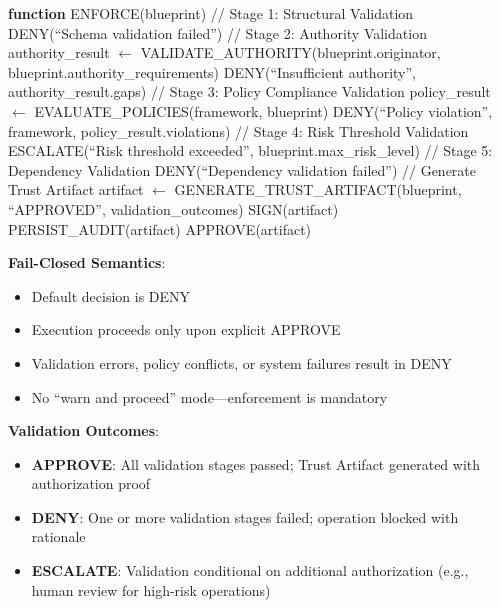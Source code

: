 \documentclass[11pt,letterpaper]{article}
\begin{document}
\begin{algorithm}
\caption{Enforcement Protocol}
\label{alg:enforce}
\begin{algorithmic}[1]
\STATE \textbf{function} ENFORCE(blueprint)
\STATE \quad // Stage 1: Structural Validation
  \RETURN DENY(``Schema validation failed'')
\ENDIF
\STATE
\STATE \quad // Stage 2: Authority Validation
\STATE \quad authority\_result $\gets$ VALIDATE\_AUTHORITY(blueprint.originator,
\STATE \qquad\qquad\qquad\qquad\qquad blueprint.authority\_requirements)
  \RETURN DENY(``Insufficient authority'', authority\_result.gaps)
\ENDIF
\STATE
\STATE \quad // Stage 3: Policy Compliance Validation
  \STATE \quad policy\_result $\gets$ EVALUATE\_POLICIES(framework, blueprint)
    \RETURN DENY(``Policy violation'', framework, policy\_result.violations)
  \ENDIF
\ENDFOR
\STATE
\STATE \quad // Stage 4: Risk Threshold Validation
  \RETURN ESCALATE(``Risk threshold exceeded'', blueprint.max\_risk\_level)
\ENDIF
\STATE
\STATE \quad // Stage 5: Dependency Validation
  \RETURN DENY(``Dependency validation failed'')
\ENDIF
\STATE
\STATE \quad // Generate Trust Artifact
\STATE \quad artifact $\gets$ GENERATE\_TRUST\_ARTIFACT(blueprint, ``APPROVED'',
\STATE \qquad\qquad\qquad\qquad\qquad\quad validation\_outcomes)
\STATE \quad SIGN(artifact)
\STATE \quad PERSIST\_AUDIT(artifact)
\STATE
\RETURN APPROVE(artifact)
\end{algorithmic}
\end{algorithm}

\textbf{Fail-Closed Semantics}:

\begin{itemize}
\item Default decision is DENY
\item Execution proceeds only upon explicit APPROVE
\item Validation errors, policy conflicts, or system failures result in DENY
\item No ``warn and proceed'' mode---enforcement is mandatory
\end{itemize}

\textbf{Validation Outcomes}:

\begin{itemize}
\item \textbf{APPROVE}: All validation stages passed; Trust Artifact generated with authorization proof
\item \textbf{DENY}: One or more validation stages failed; operation blocked with rationale
\item \textbf{ESCALATE}: Validation conditional on additional authorization (e.g., human review for high-risk operations)
\end{itemize}
\end{document}
